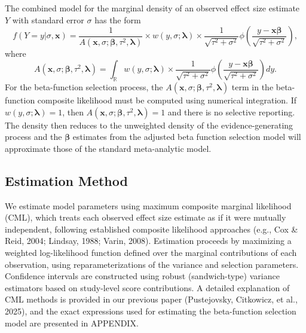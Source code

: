 \documentclass[
  american,
  man, donotrepeattitle,floatsintext]{apa7}
\begin{document}
The combined model for the marginal density of an observed effect size estimate \(Y\) with standard error \(\sigma\) has the form
\begin{equation}
\label{eq:generic-selection}
f(Y = y | \sigma, \mathbf{x}) = \frac{1}{A(\mathbf{x}, \sigma; \boldsymbol\beta, \tau^2, \boldsymbol\lambda)} \times w\left(y, \sigma; \boldsymbol\lambda \right) \times \frac{1}{\sqrt{\tau^2 + \sigma^2}} \phi\left(\frac{y - \mathbf{x} \boldsymbol\beta}{\sqrt{\tau^2 + \sigma^2}}\right),
\end{equation}
where
\begin{equation}
\label{eq:generic-selection-A}
A(\mathbf{x}, \sigma; \boldsymbol\beta, \tau^2, \boldsymbol\lambda) =  \int_\mathbb{R} w\left(y, \sigma; \boldsymbol\lambda \right) \times  \frac{1}{\sqrt{\tau^2 + \sigma^2}}\phi\left(\frac{y - \mathbf{x}\boldsymbol\beta}{\sqrt{\tau^2 + \sigma^2}}\right) dy.
\end{equation}
For the beta-function selection process, the \(A(\mathbf{x}, \sigma; \boldsymbol\beta, \tau^2, \boldsymbol\lambda)\) term in the beta-function composite likelihood must be computed using numerical integration.
If \(w(y, \sigma; \boldsymbol\lambda) = 1\), then \(A(\mathbf{x}, \sigma; \boldsymbol\beta, \tau^2, \boldsymbol\lambda) = 1\) and there is no selective reporting. The density then reduces to the unweighted density of the evidence-generating process and the \(\boldsymbol\beta\) estimates from the adjusted beta function selection model will approximate those of the standard meta-analytic model.

\subsection{Estimation Method}\label{estimation-method}

We estimate model parameters using maximum composite marginal likelihood (CML), which treats each observed effect size estimate as if it were mutually independent, following established composite likelihood approaches (e.g., Cox \& Reid, 2004; Lindsay, 1988; Varin, 2008). Estimation proceeds by maximizing a weighted log-likelihood function defined over the marginal contributions of each observation, using reparameterizations of the variance and selection parameters. Confidence intervals are constructed using robust (sandwich-type) variance estimators based on study-level score contributions. A detailed explanation of CML methods is provided in our previous paper (Pustejovsky, Citkowicz, et al., 2025), and the exact expressions used for estimating the beta-function selection model are presented in APPENDIX.
\end{document}
